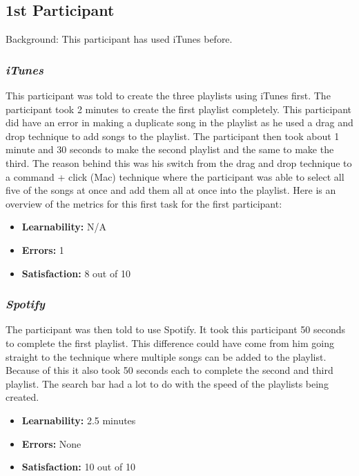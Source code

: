 \documentclass{article}
\begin{document}
\begin{multicols}{2}
\subsection{1st Participant}
Background: This participant has used iTunes before. 

\subsubsection{\it iTunes}

This participant was told to create the three playlists using iTunes first. The participant took 2 minutes to create the first playlist completely. This participant did have an error in making a duplicate song in the playlist as he used a drag and drop technique to add songs to the playlist. The participant then took about 1 minute and 30 seconds to make the second playlist and the same to make the third. The reason behind this was his switch from the drag and drop technique to a command + click (Mac) technique where the participant was able to select all five of the songs at once and add them all at once into the playlist. Here is an overview of the metrics for this first task for the first participant:
\begin{itemize}
	\item {\bf Learnability:} N/A
	\item {\bf Errors:} 1
	\item {\bf Satisfaction:} 8 out of 10 
\end{itemize}

\subsubsection{\it Spotify}
The participant was then told to use Spotify. It took this participant 50 seconds to complete the first playlist. This difference could have come from him going straight to the technique where multiple songs can be added to the playlist. Because of this it also took 50 seconds each to complete the second and third playlist. The search bar had a lot to do with the speed of the playlists being created.
\begin{itemize}
	\item {\bf Learnability:} 2.5 minutes
	\item {\bf Errors:} None
	\item {\bf Satisfaction:} 10 out of 10 
\end{itemize}


\end{multicols}
\end{document}
